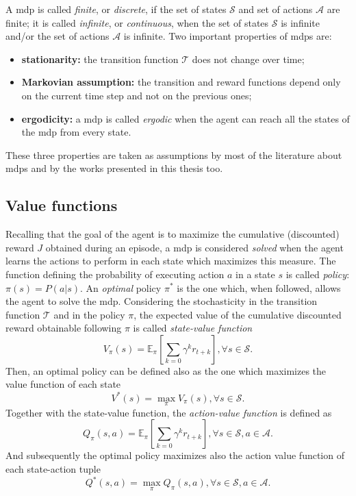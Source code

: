A \gls{mdp} is called \textit{finite}, or \textit{discrete}, if the set of states $\mathcal{S}$ and set of actions $\mathcal{A}$ are finite; it is called \textit{infinite}, or \textit{continuous}, when the set of states $\mathcal{S}$ is infinite and/or the set of actions $\mathcal{A}$ is infinite.
Two important properties of \glspl{mdp} are:
\begin{itemize}
 \item \textbf{stationarity:} the transition function $\mathcal{T}$ does not change over time;
 \item \textbf{Markovian assumption:} the transition and reward functions depend only on the current time step and not on the previous ones;
 \item \textbf{ergodicity:} a \gls{mdp} is called \textit{ergodic} when the agent can reach all the states of the \gls{mdp} from every state.
\end{itemize}
These three properties are taken as assumptions by most of the literature about \glspl{mdp} and by the works presented in this thesis too.

\subsection{Value functions}
Recalling that the goal of the agent is to maximize the cumulative (discounted) reward $J$ obtained during an episode, a \gls{mdp} is considered \textit{solved} when the agent learns the actions to perform in each state which maximizes this measure. The function defining the probability of executing action $a$ in a state $s$ is called \textit{policy}: $\pi(s) = P(a|s)$. An \textit{optimal} policy $\pi^*$ is the one which, when followed, allows the agent to solve the \gls{mdp}. Considering the stochasticity in the transition function $\mathcal{T}$ and in the policy $\pi$, the expected value of the cumulative discounted reward obtainable following $\pi$ is called \textit{state-value function}
\begin{equation}
 V_\pi(s) = \mathbb{E}_\pi[\sum_{k=0} \gamma^k r_{t+k}], \forall s \in \mathcal{S}.
\end{equation}
Then, an optimal policy can be defined also as the one which maximizes the value function of each state
\begin{equation}
 V^*(s) = \max_\pi V_\pi(s), \forall s \in \mathcal{S}.
\end{equation}
Together with the state-value function, the \textit{action-value function} is defined as
\begin{equation}
 Q_\pi(s, a) = \mathbb{E}_\pi[\sum_{k=0} \gamma^k r_{t+k}], \forall s \in \mathcal{S}, a \in \mathcal{A}.
\end{equation}
And subsequently the optimal policy maximizes also the action value function of each state-action tuple
\begin{equation}
 Q^*(s,a) = \max_\pi Q_\pi(s,a), \forall s \in \mathcal{S}, a \in \mathcal{A}.
\end{equation}

